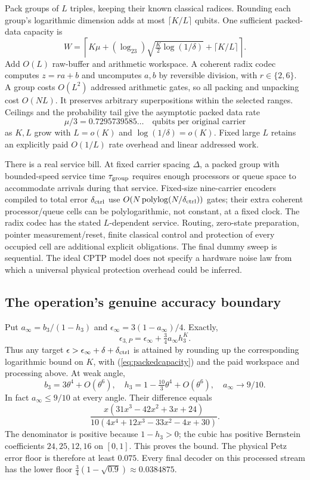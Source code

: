 Pack groups of $L$ triples, keeping their known classical radices. Rounding
each group's logarithmic dimension adds at most $\lceil K/L\rceil$ qubits.
One sufficient packed-data capacity is
\begin{equation}
 W=\left\lceil K\mu+(\log_23)\sqrt{\tfrac K2\log(1/\delta)}
       +\lceil K/L\rceil\right\rceil.\label{eq:packedcapacity}
\end{equation}
Add $O(L)$ raw-buffer and arithmetic workspace. A coherent radix codec
computes $z=ra+b$ and uncomputes $a,b$ by reversible division, with
$r\in\{2,6\}$. A group costs $O(L^2)$ addressed arithmetic gates, so all
packing and unpacking cost $O(NL)$. It preserves arbitrary superpositions
within the selected ranges. Ceilings and the probability tail give the
asymptotic packed data rate
\[
 \mu/3=0.7295739585\ldots\quad\text{qubits per original carrier}
\]
as $K,L$ grow with $L=o(K)$ and $\log(1/\delta)=o(K)$. Fixed large $L$
retains an explicitly paid $O(1/L)$ rate overhead and linear addressed work.

There is a real service bill. At fixed carrier spacing $\Delta$, a packed
group with bounded-speed service time $\tau_{\rm group}$ requires enough
processors or queue space to accommodate arrivals during that service.
Fixed-size nine-carrier encoders compiled to total error $\delta_{\rm ctrl}$
use $O(N\,\mathrm{polylog}(N/\delta_{\rm ctrl}))$ gates; their extra
coherent processor/queue cells can be polylogarithmic, not constant, at a
fixed clock. The radix codec has the stated $L$-dependent service. Routing,
zero-state preparation, pointer measurement/reset, finite classical control
and protection of every occupied cell are additional explicit obligations.
The final dummy sweep is sequential. The ideal CPTP model does not specify
a hardware noise law from which a universal physical protection overhead
could be inferred.

\subsection{The operation's genuine accuracy boundary}
Put $a_\infty=b_3/(1-h_3)$ and
$\epsilon_\infty=3(1-a_\infty)/4$. Exactly,
\[
 \epsilon_{3,P}=\epsilon_\infty+\tfrac34a_\infty h_3^K.
\]
Thus any target $\epsilon>\epsilon_\infty+\delta+\delta_{\rm ctrl}$ is attained
by rounding up the corresponding logarithmic bound on $K$, with
(\ref{eq:packedcapacity}) and the paid workspace and processing above.
At weak angle,
\[
 b_3=3\theta^4+O(\theta^6),\quad
 h_3=1-\tfrac{10}3\theta^4+O(\theta^6),\quad a_\infty\longrightarrow9/10.
\]
In fact $a_\infty\le9/10$ at every angle. Their difference equals
\[
 \frac{x(31x^3-42x^2+3x+24)}
 {10(4x^4+12x^3-33x^2-4x+30)}.
\]
The denominator is positive because $1-h_3>0$; the cubic has positive
Bernstein coefficients $24,25,12,16$ on $[0,1]$. This proves the bound.
The physical Petz error floor is therefore at least $0.075$. Every final
decoder on this processed stream has the lower floor
$\tfrac34(1-\sqrt{0.9})\approx0.0384875$.

